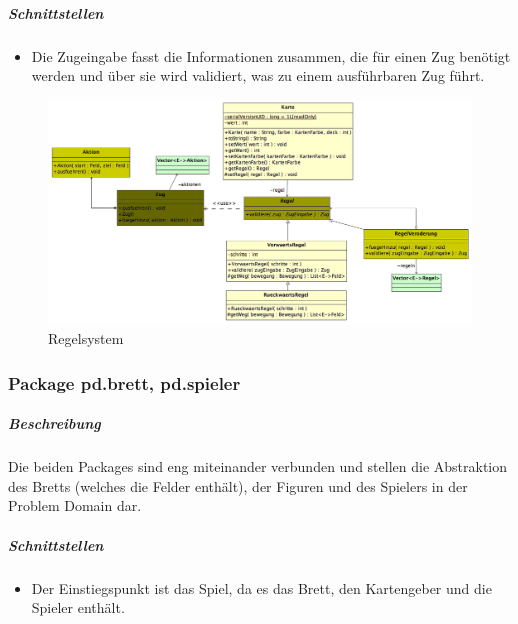 \documentclass[12pt,halfparskip]{scrartcl}
\begin{document}
\subparagraph{Schnittstellen} %
\label{ssub:schnittstellen}
\begin{itemize}
	\item Die Zugeingabe fasst die Informationen zusammen, die für einen Zug benötigt werden und über sie wird validiert, was zu einem ausführbaren Zug führt.
\end{itemize}

\begin{figure}[h]
	\centering
	\includegraphics[width=\textwidth]{pd_regelsystem}
	\caption{Regelsystem}
	\label{fig:pd_regelsystem}
\end{figure}


\clearpage
\subsubsection{Package pd.brett, pd.spieler} %
\label{ssub:package_pd_brett}
\subparagraph{Beschreibung}
Die beiden Packages sind eng miteinander verbunden und stellen die Abstraktion des Bretts (welches die Felder enthält), der Figuren und des Spielers in der Problem Domain dar.

\subparagraph{Schnittstellen}
\begin{itemize}
	\item Der Einstiegspunkt ist das Spiel, da es das Brett, den Kartengeber und die Spieler enthält.
\end{itemize}
\end{document}
